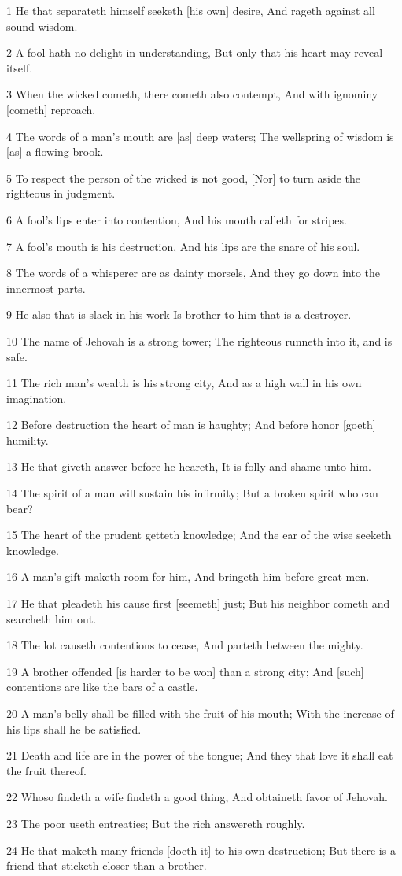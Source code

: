 \par 1 He that separateth himself seeketh [his own] desire, And rageth against all sound wisdom.
\par 2 A fool hath no delight in understanding, But only that his heart may reveal itself.
\par 3 When the wicked cometh, there cometh also contempt, And with ignominy [cometh] reproach.
\par 4 The words of a man's mouth are [as] deep waters; The wellspring of wisdom is [as] a flowing brook.
\par 5 To respect the person of the wicked is not good, [Nor] to turn aside the righteous in judgment.
\par 6 A fool's lips enter into contention, And his mouth calleth for stripes.
\par 7 A fool's mouth is his destruction, And his lips are the snare of his soul.
\par 8 The words of a whisperer are as dainty morsels, And they go down into the innermost parts.
\par 9 He also that is slack in his work Is brother to him that is a destroyer.
\par 10 The name of Jehovah is a strong tower; The righteous runneth into it, and is safe.
\par 11 The rich man's wealth is his strong city, And as a high wall in his own imagination.
\par 12 Before destruction the heart of man is haughty; And before honor [goeth] humility.
\par 13 He that giveth answer before he heareth, It is folly and shame unto him.
\par 14 The spirit of a man will sustain his infirmity; But a broken spirit who can bear?
\par 15 The heart of the prudent getteth knowledge; And the ear of the wise seeketh knowledge.
\par 16 A man's gift maketh room for him, And bringeth him before great men.
\par 17 He that pleadeth his cause first [seemeth] just; But his neighbor cometh and searcheth him out.
\par 18 The lot causeth contentions to cease, And parteth between the mighty.
\par 19 A brother offended [is harder to be won] than a strong city; And [such] contentions are like the bars of a castle.
\par 20 A man's belly shall be filled with the fruit of his mouth; With the increase of his lips shall he be satisfied.
\par 21 Death and life are in the power of the tongue; And they that love it shall eat the fruit thereof.
\par 22 Whoso findeth a wife findeth a good thing, And obtaineth favor of Jehovah.
\par 23 The poor useth entreaties; But the rich answereth roughly.
\par 24 He that maketh many friends [doeth it] to his own destruction; But there is a friend that sticketh closer than a brother.

